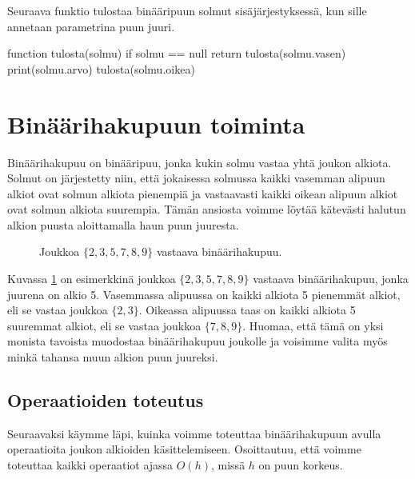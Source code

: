 Seuraava funktio tulostaa binääripuun solmut
sisäjärjestyksessä, kun sille annetaan parametrina
puun juuri.

\begin{code}
function tulosta(solmu)
    if solmu == null
        return
    tulosta(solmu.vasen)
    print(solmu.arvo)
    tulosta(solmu.oikea)
\end{code}

\section{Binäärihakupuun toiminta}

Binäärihakupuu on binääripuu, jonka kukin solmu
vastaa yhtä joukon alkiota.
Solmut on järjestetty niin, että jokaisessa solmussa
kaikki vasemman alipuun alkiot ovat solmun alkiota pienempiä
ja vastaavasti kaikki oikean alipuun alkiot
ovat solmun alkiota suurempia.
Tämän ansiosta voimme löytää kätevästi halutun
alkion puusta aloittamalla haun puun juuresta.

\begin{figure}
\center
{}
\caption{Joukkoa $\{2,3,5,7,8,9\}$ vastaava binäärihakupuu.}
\label{fig:bihpuu}
\end{figure}

Kuvassa \ref{fig:bihpuu} on esimerkkinä
joukkoa $\{2,3,5,7,8,9\}$ vastaava binääri\-hakupuu,
jonka juurena on alkio 5.
Vasemmassa alipuussa on kaikki alkiota 5
pienemmät alkiot, eli se vastaa joukkoa $\{2,3\}$.
Oikeassa alipuussa taas on kaikki alkiota 5
suuremmat alkiot, eli se vastaa joukkoa $\{7,8,9\}$.
Huomaa, että tämä on yksi monista tavoista muodostaa
binäärihakupuu joukolle ja voisimme valita myös
minkä tahansa muun alkion puun juureksi.

\subsection{Operaatioiden toteutus}

Seuraavaksi käymme läpi, kuinka voimme toteuttaa
binäärihakupuun avulla operaatioita joukon alkioiden käsittelemiseen.
Osoittautuu, että voimme toteuttaa kaikki
operaatiot ajassa $O(h)$, missä $h$ on puun korkeus.

